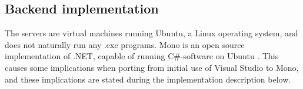 \subsection{Backend implementation}\label{subsec:backend_impl}
The servers are virtual machines running Ubuntu, a Linux operating system, and does not naturally run any .exe programs. Mono is an open source implementation of .NET, capable of running C\#-software on Ubuntu \citep{mono}. This causes some implications when porting from initial use of Visual Studio to Mono, and these implications are stated during the implementation description below. 


